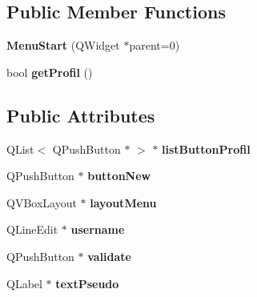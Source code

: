 \subsection*{Public Member Functions}
\begin{DoxyCompactItemize}
\item 
\hypertarget{class_menu_start_a184ff65bb2534378670fee22487b02eb}{}{\bfseries Menu\+Start} (Q\+Widget $\ast$parent=0)\label{class_menu_start_a184ff65bb2534378670fee22487b02eb}

\item 
\hypertarget{class_menu_start_aa472610f5ba9e271cb02159d2ca421cc}{}bool {\bfseries get\+Profil} ()\label{class_menu_start_aa472610f5ba9e271cb02159d2ca421cc}

\end{DoxyCompactItemize}
\subsection*{Public Attributes}
\begin{DoxyCompactItemize}
\item 
\hypertarget{class_menu_start_a04d0eac4832176f91f62172757ce0616}{}Q\+List$<$ Q\+Push\+Button $\ast$ $>$ $\ast$ {\bfseries list\+Button\+Profil}\label{class_menu_start_a04d0eac4832176f91f62172757ce0616}

\item 
\hypertarget{class_menu_start_af01ac293a06b0da924be0ad29aa587cf}{}Q\+Push\+Button $\ast$ {\bfseries button\+New}\label{class_menu_start_af01ac293a06b0da924be0ad29aa587cf}

\item 
\hypertarget{class_menu_start_a9426199e93ab1722b19b4e4e178b0164}{}Q\+V\+Box\+Layout $\ast$ {\bfseries layout\+Menu}\label{class_menu_start_a9426199e93ab1722b19b4e4e178b0164}

\item 
\hypertarget{class_menu_start_abf21ea1841ef22859a15b1c201b8bbf6}{}Q\+Line\+Edit $\ast$ {\bfseries username}\label{class_menu_start_abf21ea1841ef22859a15b1c201b8bbf6}

\item 
\hypertarget{class_menu_start_a06ebe4101b60777e4e1465e1073d533b}{}Q\+Push\+Button $\ast$ {\bfseries validate}\label{class_menu_start_a06ebe4101b60777e4e1465e1073d533b}

\item 
\hypertarget{class_menu_start_a427333babe7349783094bc9257462cb0}{}Q\+Label $\ast$ {\bfseries text\+Pseudo}\label{class_menu_start_a427333babe7349783094bc9257462cb0}

\end{DoxyCompactItemize}


